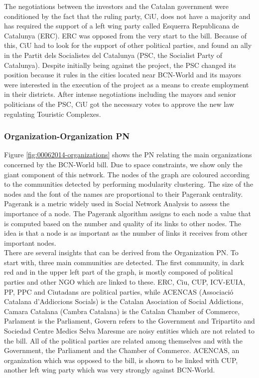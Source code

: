 The negotiations between the investors and the Catalan government were conditioned by the fact that the ruling party, CiU, does not have a majority and has required the support of a left wing party called Esquerra Republicana de Catalunya (ERC). ERC was opposed from the very start to the bill. Because of this, CiU had to look for the support of other political parties, and found an ally in the Partit dels Socialistes del Catalunya (PSC, the Socialist Party of Catalunya). Despite initially being against the project, the PSC changed its position because it rules in the cities located near BCN-World and its mayors were interested in the execution of the project as a means to create employment in their districts. After intense negotiations including the mayors and senior politicians of the PSC, CiU got the necessary votes to approve the new law regulating Touristic Complexes.

\subsubsection{Organization-Organization PN}\label{subsec:bcn_world-company-company}

Figure \ref{fig:00062014-organizations} shows the PN relating the main organizations concerned by the BCN-World bill. Due to space constraints, we show only the giant component of this network. The nodes of the graph are coloured according to the communities detected by performing modularity clustering. The size of the nodes and the font of the names are proportional to their Pagerank centrality. Pagerank is a metric widely used in Social Network Analysis to assess the importance of a node. The Pagerank algorithm assigns to each node a value that is computed based on the number and quality of its links to other nodes. The idea is that a node is as important as the number of links it receives from other important nodes.\\

There are several insights that can be derived from the Organization PN. To start with, three main communities are detected. The first community, in dark red and in the upper left part of the graph, is mostly composed of political parties and other NGO which are linked to these. ERC, Ciu, CUP, ICV-EUIA, PP, PPC and Ciutadans are political parties, while ACENCAS (Associaci\'o Catalana d'Addiccions Socials) is the Catalan Asociation of Social Addictions, Camara Catalana (Cambra Catalana) is the Catalan Chamber of Commerce, Parlament is the Parliament, Govern refers to the Government and Tripartito and Sociedad Centre Medics Selva Maresme are noisy entities which are not related to the bill. All of the political parties are related among themselves and with the Government, the Parliament and the Chamber of Commerce. ACENCAS, an organization which was opposed to the bill, is shown to be linked with CUP, another left wing party which was very strongly against BCN-World. \\

